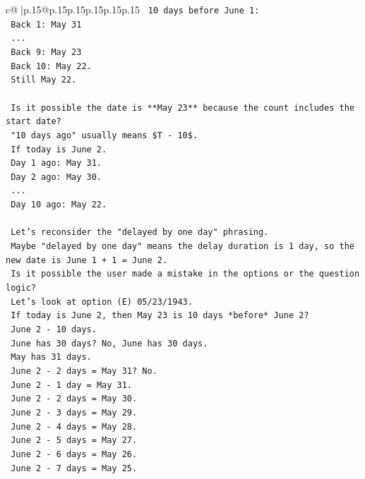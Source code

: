 \documentclass{article}
\begin{document}
{\begin{supertabular}{c@{$\;$}|p{.15\linewidth}@{}p{.15\linewidth}p{.15\linewidth}p{.15\linewidth}p{.15\linewidth}p{.15\linewidth}}
{{{\texttt{    10 days before June 1:} \\
\texttt{    Back 1: May 31} \\
\texttt{    ...} \\
\texttt{    Back 9: May 23} \\
\texttt{    Back 10: May 22.} \\
\texttt{    Still May 22.} \\
\\ 
\texttt{    Is it possible the date is **May 23** because the count includes the start date?} \\
\texttt{    "10 days ago" usually means \$T {-} 10\$.} \\
\texttt{    If today is June 2.} \\
\texttt{    Day 1 ago: May 31.} \\
\texttt{    Day 2 ago: May 30.} \\
\texttt{    ...} \\
\texttt{    Day 10 ago: May 22.} \\
\\ 
\texttt{    Let's reconsider the "delayed by one day" phrasing.} \\
\texttt{    Maybe "delayed by one day" means the delay duration is 1 day, so the new date is June 1 + 1 = June 2.} \\
\texttt{    Is it possible the user made a mistake in the options or the question logic?} \\
\texttt{    Let's look at option (E) 05/23/1943.} \\
\texttt{    If today is June 2, then May 23 is 10 days *before* June 2?} \\
\texttt{    June 2 {-} 10 days.} \\
\texttt{    June has 30 days? No, June has 30 days.} \\
\texttt{    May has 31 days.} \\
\texttt{    June 2 {-} 2 days = May 31? No.} \\
\texttt{    June 2 {-} 1 day = May 31.} \\
\texttt{    June 2 {-} 2 days = May 30.} \\
\texttt{    June 2 {-} 3 days = May 29.} \\
\texttt{    June 2 {-} 4 days = May 28.} \\
\texttt{    June 2 {-} 5 days = May 27.} \\
\texttt{    June 2 {-} 6 days = May 26.} \\
\texttt{    June 2 {-} 7 days = May 25.} \\
}}}
\end{supertabular}}
\end{document}
